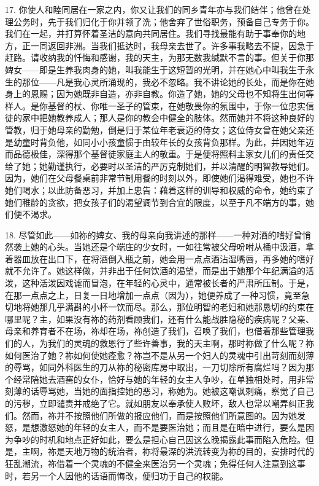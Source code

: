 17. 你使人和睦同居在一家之内，你又让我们的同乡青年亦与我们结伴；他曾在处理公务时，先于我们归化于你并领了洗；他舍弃了世俗职务，预备自己专务于你。我们在一起，并打算怀着圣洁的意向共同居住。我们寻找最能有助于事奉你的地方，正一同返回非洲。当我们抵达时，我母亲去世了。许多事我略去不提，因急于赶路。请收纳我的忏悔和感谢，我的天主，为那无数我缄默不言的事。但关于你那婢女——即是生养我肉身的她，叫我能生于这短暂的光明，并在她心中叫我生于永生的那位——凡是我心灵所涌现的，我必不忽略。我不讲论她的长处，而是你在她身上的恩赐；因为她既非自造，亦非自教。你造了她，她的父母也不知将生出何等样人。是你基督的杖、你唯一圣子的管束，在她敬畏你的氛围中，于你一位忠实信徒的家中把她教养成人；那人是你的教会中健全的肢体。然而她并不将这种良好的管教，归于她母亲的勤勉，倒是归于某位年老衰迈的侍女；这位侍女曾在她父亲还是幼童时背负他，如同小小孩童惯于由较年长的女孩背负那样。为此，并因她年迈而品德极佳，深得那个基督徒家庭主人的敬重。于是便将照料主家女儿们的责任交给了她；她勤谨执行，必要时以圣洁的严厉克制她们，并以清醒的明智教导她们。因为，她们在父母餐桌前非常节制用餐的时刻以外，即使她们渴得难受，她也不许她们喝水；以此防备恶习，并加上忠告：藉着这样的训导和权威的命令，她约束了她们稚龄的贪欲，把女孩子们的渴望调节到合宜的限度，以至于凡不端方的事，她们便不渴求。\par

18. 尽管如此——如祢的婢女、我的母亲向我讲述的那样——一种对酒的嗜好曾悄然袭上她的心头。当她还是个端庄的少女时，一如往常被父母吩咐从桶中汲酒，拿着器皿放在出口下，在将酒倒入瓶之前，她会用一点点酒沾湿嘴唇，再多她的嗜好就不允许了。她这样做，并非出于任何饮酒的渴望，而是出于她那个年纪满溢的活泼，这种活泼因戏谑而冒泡，在年轻的心灵中，通常被长者的严肃所压制。于是，在那一点点之上，日复一日地增加一点点（因为），她便养成了一种习惯，竟至急切地将她那几乎满斟的小杯一饮而尽。那么，那位明智的老妇和她那恳切的约束在哪里呢？主，如果没有祢的药剂看顾我们，还有什么能战胜隐秘的疾病呢？父亲、母亲和养育者不在场，祢却在场，祢创造了我们，召唤了我们，也借着那些管理我们的人，为我们的灵魂的救恩行了些许善事，我的天主啊，那时祢做了什么呢？祢如何医治了她？祢如何使她痊愈？祢岂不是从另一个妇人的灵魂中引出苛刻而刻薄的辱骂，如同外科医生的刀从祢的秘密库房中取出，一刀切除所有腐烂吗？因为那个经常陪她去酒窖的女仆，恰好与她的年轻的女主人争吵，在单独相处时，用非常刻薄的话辱骂她，当她的面指控她的恶习，称她为。她被这嘲讽刺痛，察觉了自己的污秽，立即谴责并戒绝了它。就如朋友以奉承使人败坏，敌人也常以嘲弄纠正我们。然而，祢并不按照他们所做的报应他们，而是按照他们所意图的。因为她发怒，是想激怒她的年轻的女主人，而不是要医治她；而且是在暗中进行，要么是因为争吵的时机和地点正好如此，要么是担心自己因这么晚揭露此事而陷入危险。但是，主啊，祢是天地万物的统治者，祢将最深的洪流转变为祢的目的，安排时代的狂乱潮流，祢借着一个灵魂的不健全来医治另一个灵魂；免得任何人注意到这事时，若另一个人因他的话语而悔改，便归功于自己的权能。\par

